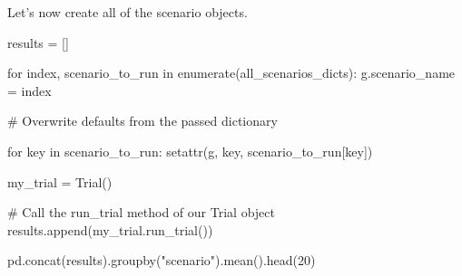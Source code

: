 \documentclass[
  letterpaper,
  DIV=11,
  numbers=noendperiod]{scrreprt}
\newenvironment{Shaded}{}{}
\newcommand{\BuiltInTok}[1]{\textcolor[rgb]{0.84,0.23,0.29}{#1}}
\newcommand{\CommentTok}[1]{\textcolor[rgb]{0.42,0.45,0.49}{#1}}
\newcommand{\ControlFlowTok}[1]{\textcolor[rgb]{0.84,0.23,0.29}{#1}}
\newcommand{\DecValTok}[1]{\textcolor[rgb]{0.00,0.36,0.77}{#1}}
\newcommand{\KeywordTok}[1]{\textcolor[rgb]{0.84,0.23,0.29}{#1}}
\newcommand{\NormalTok}[1]{\textcolor[rgb]{0.14,0.16,0.18}{#1}}
\newcommand{\OperatorTok}[1]{\textcolor[rgb]{0.14,0.16,0.18}{#1}}
\newcommand{\StringTok}[1]{\textcolor[rgb]{0.01,0.18,0.38}{#1}}
\begin{document}
Let's now create all of the scenario objects.

\begin{Shaded}
\begin{Highlighting}[]
\NormalTok{results }\OperatorTok{=}\NormalTok{ []}

\ControlFlowTok{for}\NormalTok{ index, scenario\_to\_run }\KeywordTok{in} \BuiltInTok{enumerate}\NormalTok{(all\_scenarios\_dicts):}
\NormalTok{    g.scenario\_name }\OperatorTok{=}\NormalTok{ index}

    \CommentTok{\# Overwrite defaults from the passed dictionary}

    \ControlFlowTok{for}\NormalTok{ key }\KeywordTok{in}\NormalTok{ scenario\_to\_run:}
        \BuiltInTok{setattr}\NormalTok{(g, key, scenario\_to\_run[key])}

\NormalTok{    my\_trial }\OperatorTok{=}\NormalTok{ Trial()}

    \CommentTok{\# Call the run\_trial method of our Trial object}
\NormalTok{    results.append(my\_trial.run\_trial())}

\NormalTok{pd.concat(results).groupby(}\StringTok{"scenario"}\NormalTok{).mean().head(}\DecValTok{20}\NormalTok{)}
\end{Highlighting}
\end{Shaded}
\end{document}
